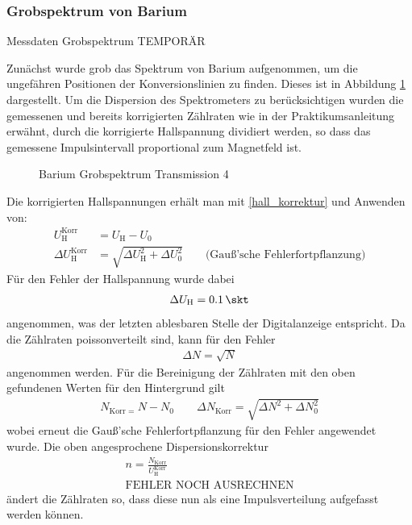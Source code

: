 \documentclass[11pt, a4paper]{article}
\numberwithin{equation}{section}
\begin{document}
\subsubsection{Grobspektrum von Barium}
\begin{table}[h]
	\centering
	
	\caption{Messdaten Grobspektrum TEMPORÄR}
	\label{tab:spektrum_ba4_grob}
\end{table}
Zunächst wurde grob das Spektrum von Barium aufgenommen, um die ungefähren Positionen der Konversionslinien zu finden.
Dieses ist in Abbildung \ref{fig:ba_t4_grob} dargestellt. 
Um die Dispersion des Spektrometers zu berücksichtigen wurden die gemessenen und bereits korrigierten Zählraten wie in der Praktikumsanleitung erwähnt, durch die korrigierte Hallspannung dividiert werden, so dass das gemessene Impulsintervall proportional zum Magnetfeld ist.
\begin{figure}[h]
	\centering
	
	\caption{Barium Grobspektrum Transmission 4}
	\label{fig:ba_t4_grob}
\end{figure}
Die korrigierten Hallspannungen erhält man mit \eqref{hall_korrektur} und Anwenden von:
\begin{align}
U_\mathrm{H}^\mathrm{Korr} &= U_\mathrm{H} - U_0 \\
\Delta U_\mathrm{H}^\mathrm{Korr} &= \sqrt{\Delta U_\mathrm{H}^2 + \Delta U_0^2} \qquad \text{(Gauß'sche Fehlerfortpflanzung)}
\end{align}
Für den Fehler der Hallspannung wurde dabei
\begin{align}
	\Delta U_\mathrm{H} = \SI{0.1}{\skt}
\end{align}
angenommen, was der letzten ablesbaren Stelle der Digitalanzeige entspricht.
Da die Zählraten poissonverteilt sind, kann für den Fehler
\begin{align}
	\Delta N = \sqrt{N}
\end{align}
angenommen werden.
Für die Bereinigung der Zählraten mit den oben gefundenen Werten für den Hintergrund gilt
\begin{align}
	N_\text{Korr = }N - N_0 \qquad \Delta N_\text{Korr} = \sqrt{\Delta N^2 + \Delta N_0^2}
\end{align}
wobei erneut die Gauß'sche Fehlerfortpflanzung für den Fehler angewendet wurde.
Die oben angesprochene Dispersionskorrektur 
\begin{align}
	n = \frac{N_\text{Korr}}{U_\mathrm{H}^\mathrm{Korr}} \\	
	\text{FEHLER NOCH AUSRECHNEN}
\end{align}
ändert die Zählraten so, dass diese nun als eine Impulsverteilung aufgefasst werden können. 
\end{document}
